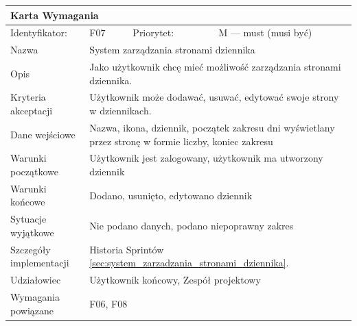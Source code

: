 \documentclass[a4paper,11pt]{report}
\begin{document}
		\begin{tabular}{|p{3cm}|p{2cm}|p{2cm}|p{6cm}|}
		\hline
		\multicolumn{4}{|p{12 cm}|}{Karta Wymagania}\\
		\hline
		Identyfikator: & F07 & Priorytet: & M — must (musi być)\\
		\hline
		Nazwa & \multicolumn{3}{|p{10 cm}|}{System zarządzania stronami dziennika}\\
		\hline
		Opis & \multicolumn{3}{|p{10 cm}|}{Jako użytkownik chcę mieć możliwość zarządzania stronami dziennika.}\\
		\hline
		Kryteria akceptacji & \multicolumn{3}{|p{10 cm}|}{Użytkownik może dodawać, usuwać, edytować swoje strony w dziennikach.}\\
		\hline
		Dane wejściowe & \multicolumn{3}{|p{10 cm}|}{Nazwa, ikona, dziennik, początek zakresu dni wyświetlany przez stronę w formie liczby, koniec zakresu}\\
		\hline
		Warunki początkowe & \multicolumn{3}{|p{10 cm}|}{Użytkownik jest zalogowany, użytkownik ma utworzony dziennik}\\
		\hline
		Warunki końcowe & \multicolumn{3}{|p{10 cm}|}{Dodano, usunięto, edytowano dziennik}\\
		\hline
		Sytuacje wyjątkowe & \multicolumn{3}{|p{10 cm}|}{Nie podano danych, podano niepoprawny zakres}\\
		\hline
		Szczegóły implementacji & \multicolumn{3}{|p{10 cm}|}{Historia Sprintów \ref{sec:system_zarzadzania_stronami_dziennika}.}\\
		\hline
		Udziałowiec & \multicolumn{3}{|p{10 cm}|}{Użytkownik końcowy, Zespół projektowy}\\
		\hline
		Wymagania powiązane & \multicolumn{3}{|p{10 cm}|}{F06, F08}\\
		\hline
		\end{tabular}
		\newline
		\vspace*{0,2 cm}
		\newline
\end{document}
